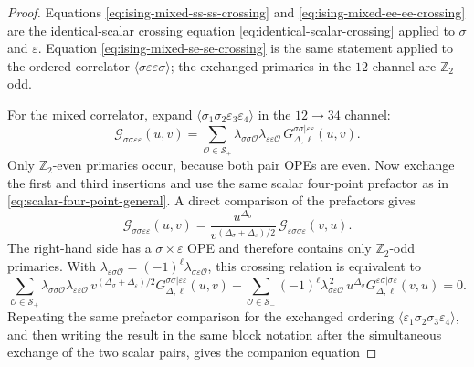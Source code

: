 \begin{proof}
Equations \eqref{eq:ising-mixed-ss-ss-crossing} and
\eqref{eq:ising-mixed-ee-ee-crossing} are the identical-scalar crossing
equation \eqref{eq:identical-scalar-crossing} applied to \(\sigma\) and
\(\varepsilon\).  Equation \eqref{eq:ising-mixed-se-se-crossing} is the same
statement applied to the ordered correlator
\(\langle\sigma\varepsilon\varepsilon\sigma\rangle\); the exchanged primaries
in the \(12\) channel are \(\mathbb Z_2\)-odd.

For the mixed correlator, expand
\(\langle\sigma_1\sigma_2\varepsilon_3\varepsilon_4\rangle\) in the
\(12\to34\) channel:
\[
  \mathcal G_{\sigma\sigma\varepsilon\varepsilon}(u,v)
  =
  \sum_{\mathcal O\in\mathcal S_+}
  \lambda_{\sigma\sigma\mathcal O}
  \lambda_{\varepsilon\varepsilon\mathcal O}\,
  G_{\Delta,\ell}^{\sigma\sigma|\varepsilon\varepsilon}(u,v).
\]
Only \(\mathbb Z_2\)-even primaries occur, because both pair OPEs are even.
Now exchange the first and third insertions and use the same scalar
four-point prefactor as in \eqref{eq:scalar-four-point-general}.  A direct
comparison of the prefactors gives
\begin{equation}
  \mathcal G_{\sigma\sigma\varepsilon\varepsilon}(u,v)
  =
  \frac{u^{\Delta_\sigma}}
       {v^{(\Delta_\sigma+\Delta_\varepsilon)/2}}\,
  \mathcal G_{\varepsilon\sigma\sigma\varepsilon}(v,u).
  \label{eq:mixed-sigma-sigma-epsilon-epsilon-prefactor-crossing}
\end{equation}
The right-hand side has a \(\sigma\times\varepsilon\) OPE and therefore
contains only \(\mathbb Z_2\)-odd primaries.  With
\(\lambda_{\varepsilon\sigma\mathcal O}
=(-1)^\ell\lambda_{\sigma\varepsilon\mathcal O}\), this crossing relation is
equivalent to
\begin{equation}
  \sum_{\mathcal O\in\mathcal S_+}
  \lambda_{\sigma\sigma\mathcal O}
  \lambda_{\varepsilon\varepsilon\mathcal O}\,
  v^{(\Delta_\sigma+\Delta_\varepsilon)/2}
  G_{\Delta,\ell}^{\sigma\sigma|\varepsilon\varepsilon}(u,v)
  -
  \sum_{\mathcal O\in\mathcal S_-}
  (-1)^\ell\lambda_{\sigma\varepsilon\mathcal O}^{\,2}\,
  u^{\Delta_\sigma}
  G_{\Delta,\ell}^{\varepsilon\sigma|\sigma\varepsilon}(v,u)
  =
  0.
  \label{eq:mixed-sigma-crossing-unsymmetrized}
\end{equation}
Repeating the same prefactor comparison for the exchanged ordering
\(\langle\varepsilon_1\sigma_2\sigma_3\varepsilon_4\rangle\), and then
writing the result in the same block notation after the simultaneous exchange
of the two scalar pairs, gives the companion equation

\end{proof}
